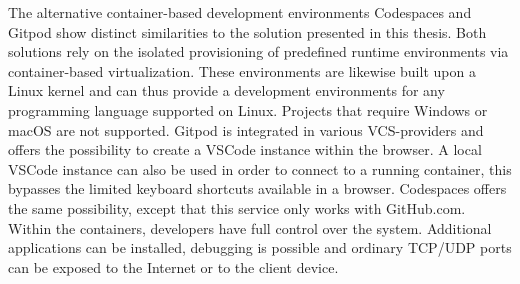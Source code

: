         The alternative container-based development environments Codespaces and Gitpod show distinct similarities to the solution presented in this thesis. Both solutions rely on the isolated provisioning of predefined runtime environments via container-based virtualization. These environments are likewise built upon a Linux kernel and can thus provide a development environments for any programming language supported on Linux. Projects that require Windows or macOS are not supported.\newline
        Gitpod is integrated in various \ac{VCS}-providers and offers the possibility to create a \ac{VSCode} instance within the browser. A local \ac{VSCode} instance can also be used in order to connect to a running container, this bypasses the limited keyboard shortcuts available in a browser. Codespaces offers the same possibility, except that this service only works with GitHub.com. Within the containers, developers have full control over the system. Additional applications can be installed, debugging is possible and ordinary TCP/UDP ports can be exposed to the Internet or to the client device.\newline
